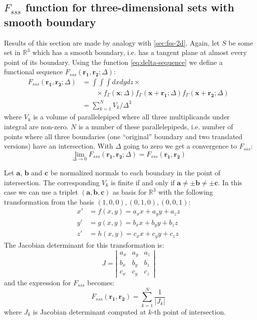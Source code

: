 \documentclass[1p]{elsarticle}
\begin{document}
\subsection{$F_{sss}$ function for three-dimensional sets with smooth boundary}
\label{sec:fsss-3d}
Results of this section are made by analogy with \cref{sec:fss-2d}. Again, let
$S$ be some set in $\mathbb{R}^3$ which has a smooth boundary, i.e. has a
tangent plane at almost every point of its boundary. Using the function
\cref{eq:delta-sequence} we define a functional sequence
$F_{sss}(\bm{r_1}, \bm{r_2}; \Delta)$:
\begin{equation}
  \begin{aligned}
    F_{sss}(\bm{r_1}, \bm{r_2}; \Delta) &= \int\int\int dx dy dz \times \\
    &\qquad \times f_\Gamma(\bm{x}; \Delta) f_\Gamma(\bm{x} + \bm{r_1}; \Delta)
    f_\Gamma(\bm{x} + \bm{r_2}; \Delta) \\
    &= \sum_{k=1}^N V_k/\Delta^3
  \end{aligned}
\end{equation}
where $V_k$ is a volume of parallelepiped where all three multiplicands under
integral are non-zero. $N$ is a number of these parallelepipeds, i.e. number of
points where all three boundaries (one ``original'' boundary and two translated
versions) have an intersection. With $\Delta$ going to zero we get a convergence
to $F_{sss}$:
\begin{equation}
  \lim_{\Delta \to 0} F_{sss}(\bm{r_1}, \bm{r_2}; \Delta) = F_{sss}(\bm{r_1},
  \bm{r_2})
\end{equation}

Let $\bm{a}$, $\bm{b}$ and $\bm{c}$ be normalized normals to each boundary in
the point of intersection. The corresponding $V_k$ is finite if and only if
$\bm{a} \ne \pm \bm{b} \ne \pm \bm{c}$. In this case we can use a triplet
$(\bm{a}, \bm{b}, \bm{c})$ as basis for $\mathbb{R}^3$ with the following
transformation from the basis $(1,0,0), (0,1,0), (0, 0, 1)$:
\begin{equation}
  \begin{aligned}
    x' &= f(x, y) = a_x x + a_y y + a_z z \\
    y' &= g(x, y) = b_x x + b_y y + b_z z \\
    z' &= h(x, y) = c_x x + c_y y + c_z z
  \end{aligned}
\end{equation}
The Jacobian determinant for this transformation is:
\begin{equation}
  J = \left|
  \begin{array}{ccc}
    a_x & a_y & a_z \\
    b_x & b_y & b_z \\
    c_x & c_y & c_z
  \end{array}
  \right|
\end{equation}
and the expression for $F_{sss}$ becomes:
\begin{equation}
  F_{sss}(\bm{r_1}, \bm{r_2}) = \sum_{k=1}^N \frac{1}{|J_k|} \label{eq:fsss-3d}
\end{equation}
where $J_k$ is Jacobian determinant computed at $k$-th point of
intersection.
\end{document}
